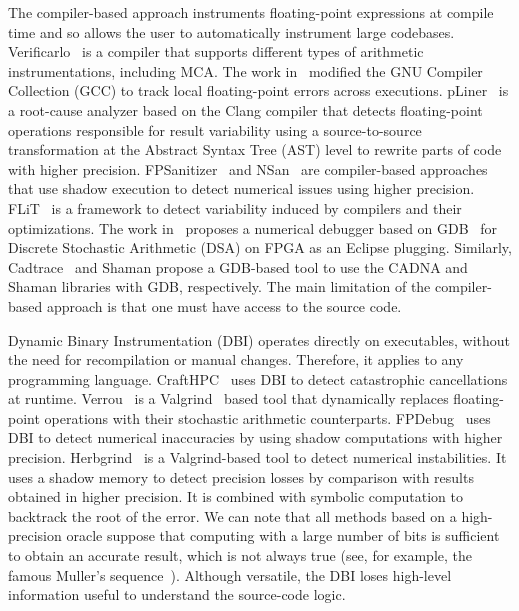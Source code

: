 \documentclass[10pt,journal,compsoc]{IEEEtran}
\begin{document}

The compiler-based approach instruments floating-point expressions at compile
time and so allows the user to automatically instrument large codebases.
Verificarlo~\cite{verificarlo} is a compiler that supports different types of
arithmetic instrumentations, including MCA. The work in~\cite{bao2013fly}
modified the GNU Compiler Collection (GCC) to track local floating-point errors
across executions. pLiner~\cite{guo2020pliner} is a root-cause analyzer based on
the Clang compiler that detects floating-point operations responsible for result
variability using a source-to-source transformation at the Abstract Syntax Tree
(AST) level to rewrite parts of code with higher precision.
FPSanitizer~\cite{chowdhary2020debugging,chowdhary2021parallel} and
NSan~\mbox{\cite{courbet2021nsan}} are compiler-based approaches
that use shadow execution to detect numerical issues using higher
precision.
FLiT~\cite{sawaya2017flit} is a framework to detect variability
induced by compilers and their optimizations. The work
in~\cite{wang2012development} proposes a numerical debugger based on
GDB~\cite{stallman1988debugging} for Discrete Stochastic Arithmetic (DSA) on
FPGA as an Eclipse plugging. Similarly, Cadtrace~\cite{jezequel2008cadna} and
Shaman propose a GDB-based tool to use the CADNA and Shaman libraries with GDB,
respectively. The main limitation of the compiler-based approach is that one
must have access to the source code.

Dynamic Binary Instrumentation (DBI) operates directly on executables, without
the need for recompilation or manual changes. Therefore, it applies to any
programming language. CraftHPC~\cite{lam2013dynamic} uses DBI to detect
catastrophic cancellations at runtime. Verrou~\cite{fevotte2016verrou} is a
Valgrind~\cite{nethercote2007valgrind} based tool that dynamically replaces
floating-point operations with their stochastic arithmetic counterparts.
FPDebug~\cite{benz2012dynamic} uses DBI to detect numerical inaccuracies by
using shadow computations with higher precision.
Herbgrind~\cite{sanchez2017finding} is a Valgrind-based tool to
detect numerical instabilities. It uses a shadow memory to detect  precision
losses by comparison with results obtained in higher
precision. It is combined with symbolic computation to backtrack the root of the
error. We can note that all methods based on a high-precision oracle suppose
that computing with a large number of bits is sufficient to obtain an accurate
result, which is not always true (see, for example, the famous Muller's
sequence~\cite{bajard1996introduction}). Although versatile, the DBI loses
high-level information useful to understand the source-code logic.
\end{document}
